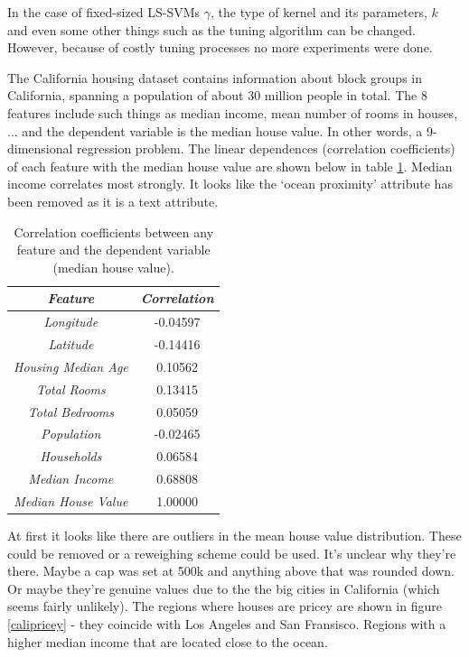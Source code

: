 In the case of fixed-sized LS-SVMs $\gamma$, the type of kernel and its parameters, $k$ and even some other things such as the tuning algorithm can be changed. However, because of costly tuning processes no more experiments were done. 


The California housing dataset contains information about block groups in California, spanning a population of about 30 million people in total. The 8 features include such things as median income, mean number of rooms in houses, ... and the dependent variable is the median house value. In other words, a 9-dimensional regression problem. The linear dependences (correlation coefficients) of each feature with the median house value are shown below in table \ref{calicorrcoef}. Median income correlates most strongly. It looks like the `ocean proximity' attribute has been removed as it is a text attribute.

\begingroup
\begin{table}
\centering
\begin{tabular}{c|c}
\textit{Feature} & \textit{Correlation}\\\hline
\textit{Longitude} & -0.04597\\
\textit{Latitude} & -0.14416\\
\textit{Housing Median Age} & 0.10562\\
\textit{Total Rooms} & 0.13415\\
\textit{Total Bedrooms} & 0.05059\\
\textit{Population} & -0.02465\\
\textit{Households} & 0.06584\\
\textit{Median Income} & 0.68808\\
\textit{Median House Value} & 1.00000
\end{tabular}
\caption{Correlation coefficients between any feature and the dependent variable (median house value).}
\label{calicorrcoef}
\end{table}

\par At first it looks like there are outliers in the mean house value distribution. These could be removed or a reweighing scheme could be used. It's unclear why they're there. Maybe a cap was set at 500k and anything above that was rounded down. Or maybe they're genuine values due to the the big cities in California (which seems fairly unlikely). The regions where houses are pricey are shown in figure \ref{calipricey} - they coincide with Los Angeles and San Fransisco. Regions with a higher median income that are located close to the ocean.

